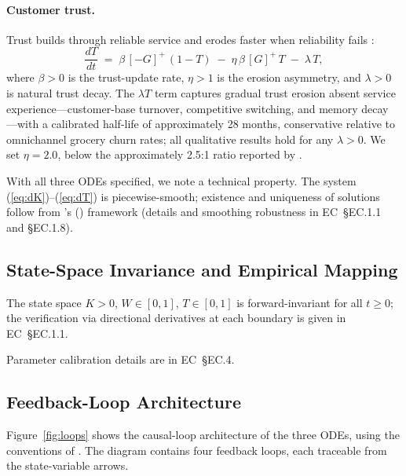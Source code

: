 \documentclass[msom,dblanonrev]{informs4}
\newcommand{\Gp}{[G]^{+}}
\newcommand{\Gm}{[-G]^{+}}
\begin{document}
\paragraph{Customer trust.}
Trust builds through reliable service and erodes faster when reliability fails \citep{sirdeshmukh2002consumer, mittal1998asymmetric}:
\begin{equation}\label{eq:dT}
    \frac{dT}{dt} \;=\; \beta\,\Gm\,(1 - T) \;-\; \eta\,\beta\,\Gp\, T \;-\; \lambda\, T,
\end{equation}
where $\beta > 0$ is the trust-update rate, $\eta > 1$ is the erosion asymmetry, and $\lambda > 0$ is natural trust decay. The $\lambda T$ term captures gradual trust erosion absent service experience---customer-base turnover, competitive switching, and memory decay \citep{mcknight2002developing}---with a calibrated half-life of approximately 28 months, conservative relative to omnichannel grocery churn rates; all qualitative results hold for any $\lambda > 0$. We set $\eta = 2.0$, below the approximately 2.5:1 ratio reported by \citet{sirdeshmukh2002consumer}.

With all three ODEs specified, we note a technical property. The system (\ref{eq:dK})--(\ref{eq:dT}) is piecewise-smooth; existence and uniqueness of solutions follow from \citeauthor{filippov1988differential}'s (\citeyear{filippov1988differential}) framework (details and smoothing robustness in EC~\S EC.1.1 and \S EC.1.8).

\subsection{State-Space Invariance and Empirical Mapping}\label{sec:model:invariance}

The state space $K > 0$, $W \in [0,1]$, $T \in [0,1]$ is forward-invariant for all $t \geq 0$; the verification via directional derivatives at each boundary is given in EC~\S EC.1.1.

Parameter calibration details are in EC~\S EC.4.


\subsection{Feedback-Loop Architecture}\label{sec:model:loops}

Figure~\ref{fig:loops} shows the causal-loop architecture of the three ODEs, using the conventions of \citet{sterman2000business}. The diagram contains four feedback loops, each traceable from the state-variable arrows.
\end{document}
